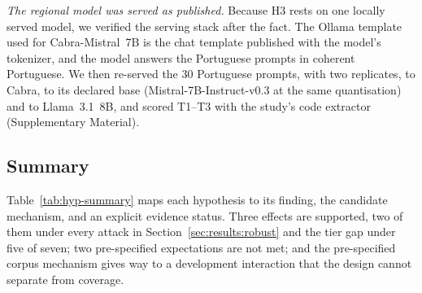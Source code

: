\emph{The regional model was served as published.} Because H3 rests on one
locally served model, we verified the serving stack after the fact. The Ollama
template used for Cabra-Mistral~7B is the chat template published with the
model's tokenizer, and the model answers the Portuguese prompts in coherent
Portuguese. We then re-served the 30 Portuguese prompts, with two replicates,
to Cabra, to its declared base (Mistral-7B-Instruct-v0.3 at the same
quantisation) and to Llama~3.1~8B, and scored T1--T3 with the study's code
extractor (Supplementary Material). \ncabrasanitysentence{}

\subsection{Summary}
\label{sec:results:summary}

Table~\ref{tab:hyp-summary} maps each hypothesis to its finding, the candidate
mechanism, and an explicit evidence status. Three effects are supported, two of
them under every attack in Section~\ref{sec:results:robust} and the tier gap
under five of seven; two pre-specified expectations are not met; and the
pre-specified corpus mechanism gives way to a development interaction that the
design cannot separate from coverage.

